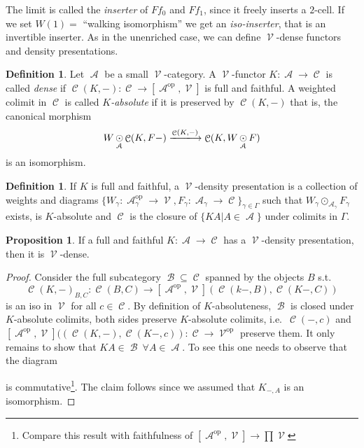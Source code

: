 \documentclass[a4paper,11pt,oneside,openany]{scrbook}
\newcommand{\from}{\colon}
\DeclareMathOperator{\op}{\text{op}}
\DeclareMathOperator{\V}{\mathcal{V}}
\DeclareMathOperator{\A}{\mathcal{A}}
\DeclareMathOperator{\B}{\mathcal{B}}
\DeclareMathOperator{\C}{\mathcal{C}}
\DeclareMathOperator{\copw}{\odot}
\theoremstyle{definition}
\theoremstyle{definition}
\newtheorem{defn}[thm]{Definition} %
\newtheorem{prop}[thm]{Proposition}
\begin{document}
The limit is called the \emph{inserter} of $Ff_0$ and $Ff_1$, since it freely inserts a $2$-cell. If we set $W(1)=$  ``walking isomorphism'' we get an \emph{iso-inserter}, that is an invertible inserter.
As in the unenriched case, we can define $\V$-dense functors and density presentations. 
\begin{defn}
   Let $\A$ be a small $\V$-category. A $\V$-functor $K\from\A\to\C$ is called \emph{dense} if $\C(K,-)\from\C\to[\A^{\op},\V]$ is full and faithful. A weighted colimit in $\C$ is called \emph{$K$-absolute} if it is preserved by $\C(K,-)$ that is, the canonical morphism
   $$W\copw_{\A}\C(K,F-)\xlongrightarrow{\C(K,-)}\C(K,W\copw_{\A} F)$$
   is an isomorphism. 
\end{defn}
		
\begin{defn}
   If $K$ is full and faithful, a $\V$-density presentation is a collection of weights and diagrams $\{W_\gamma\colon\A^{\op}_\gamma\to\V, F_\gamma\colon\A_\gamma\to\C\}_{\gamma\in\Gamma}$ such that $W_\gamma\copw_{\A_\gamma}F_\gamma$ exists, is $K$-absolute and $\C$ is the closure of $\{KA|A\in\A\}$ under colimits in $\Gamma$.
\end{defn}		
		\begin{prop}
		   If a full and faithful $K\from\A\to\C$ has a $\V$-density presentation, then it is $\V$-dense.
		\end{prop}
		\begin{proof}
		Consider the full subcategory $\B\subseteq\C$ spanned by the objects $B$ s.t.\ $$\C(K,-)_{B,C}\colon\C(B,C)\to[\A^{\op},\V](\C(k-,B),\C(K-,C))$$ is an iso in $\V$ for all $c\in\C$. By definition of $K$-absoluteness, $\B$ is closed under $K$-absolute colimits, both sides preserve $K$-absolute colimits, i.e.\ $\C(-,c)$ and $[\A^{\op},\V]((\C(K,-),\C(K-,c))\colon\C\to\V^{\op}$ preserve them. It only remains to show that $KA\in\B\ \forall A\in\A$. To see this one needs to observe that the diagram
		 \begin{center}
   \end{center}
is commutative\footnote{Compare this result with faithfulness of $[\A^{\op},\V]\to\prod\V$ }. The claim follows since we assumed that $K_{-,A}$ is an isomorphism.
		\end{proof}
\end{document}
